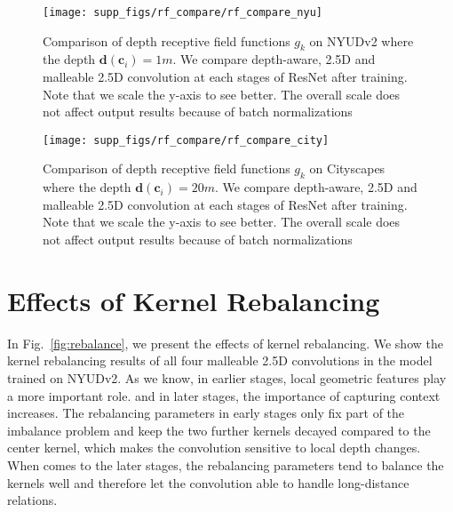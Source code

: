 \documentclass[runningheads]{llncs}
\begin{document}
\begin{figure}[htbp]
  \centering
  \texttt{[image: supp\_figs/rf\_compare/rf\_compare\_nyu]}
  \caption{
  Comparison of depth receptive field functions $g_k$ on NYUDv2 where the depth $\mathbf{d}(\mathbf{c}_i)=1m$.
  We compare depth-aware, 2.5D and malleable 2.5D convolution at each stages of ResNet after training.
  Note that we scale the y-axis to see better.
  The overall scale does not affect output results because of batch normalizations
  }
  \label{fig:rf_compare_nyu}
\end{figure}

\begin{figure}[htbp]
  \centering
  \texttt{[image: supp\_figs/rf\_compare/rf\_compare\_city]}
  \caption{
  Comparison of depth receptive field functions $g_k$ on Cityscapes where the depth $\mathbf{d}(\mathbf{c}_i)=20m$.
  We compare depth-aware, 2.5D and malleable 2.5D convolution at each stages of ResNet after training.
  Note that we scale the y-axis to see better.
  The overall scale does not affect output results because of batch normalizations
  }
  \label{fig:rf_compare_city}
\end{figure}

\section{Effects of Kernel Rebalancing}
In Fig.~\ref{fig:rebalance}, we present the effects of kernel rebalancing.
We show the kernel rebalancing results of all four malleable 2.5D convolutions in the model trained on NYUDv2.
As we know,
in earlier stages, local geometric features play a more important role.
and in later stages, the importance of capturing context increases.
The rebalancing parameters in early stages only fix part of the imbalance problem and keep the two further kernels decayed compared to the center kernel, which makes the convolution sensitive to local depth changes.
When comes to the later stages, the rebalancing parameters tend to balance the kernels well and therefore let the convolution able to handle long-distance relations.
\end{document}
